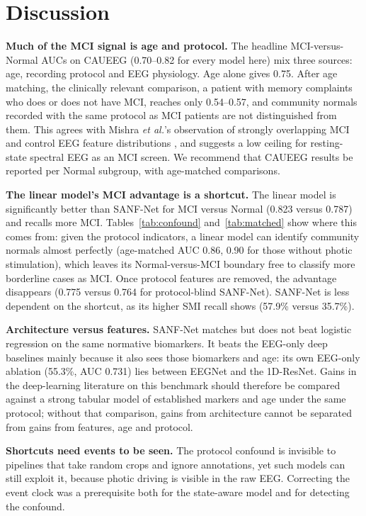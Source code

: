 \documentclass[conference]{IEEEtran}
\begin{document}
\section{Discussion}

\textbf{Much of the MCI signal is age and protocol.} The headline MCI-versus-Normal AUCs on CAUEEG
(0.70--0.82 for every model here) mix three sources: age, recording protocol and EEG physiology. Age
alone gives 0.75. After age matching, the clinically relevant comparison, a patient with memory
complaints who does or does not have MCI, reaches only 0.54--0.57, and community normals recorded with
the same protocol as MCI patients are not distinguished from them. This agrees with Mishra
\textit{et al.}'s observation of strongly overlapping MCI and control EEG feature distributions
\cite{geneeg2025}, and suggests a low ceiling for resting-state spectral EEG as an MCI screen. We
recommend that CAUEEG results be reported per Normal subgroup, with age-matched comparisons.

\textbf{The linear model's MCI advantage is a shortcut.} The linear model is significantly better than
SANF-Net for MCI versus Normal (0.823 versus 0.787) and recalls more MCI. Tables~\ref{tab:confound}
and~\ref{tab:matched} show where this comes from: given the protocol indicators, a linear model can
identify community normals almost perfectly (age-matched AUC 0.86, 0.90 for those without photic
stimulation), which leaves its Normal-versus-MCI boundary free to classify more borderline cases as
MCI. Once protocol features are removed, the advantage disappears (0.775 versus 0.764 for
protocol-blind SANF-Net). SANF-Net is less dependent on the shortcut, as its higher SMI recall shows
(57.9\% versus 35.7\%).

\textbf{Architecture versus features.} SANF-Net matches but does not beat logistic regression on the same
normative biomarkers. It beats the EEG-only deep baselines mainly because it also sees those
biomarkers and age: its own EEG-only ablation (55.3\%, AUC 0.731) lies between EEGNet and the 1D-ResNet. Gains in the deep-learning literature on
this benchmark should therefore be compared against a strong tabular model of established markers and
age under the same protocol; without that comparison, gains from architecture cannot be separated from
gains from features, age and protocol.

\textbf{Shortcuts need events to be seen.} The protocol confound is invisible to pipelines that take
random crops and ignore annotations, yet such models can still exploit it, because photic driving is
visible in the raw EEG. Correcting the event clock was a prerequisite both for the state-aware model
and for detecting the confound.
\end{document}
